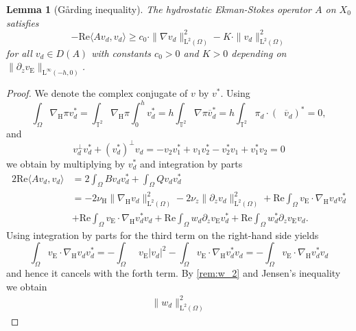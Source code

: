 \documentclass[preprint]{elsarticle}
\newtheorem{lem}[lem]{Lemma}
\numberwithin{equation}{section}
\newcommand {\T}	{\mathbb{T}}
\DeclareMathOperator{\divH}{div_{\H}}
\renewcommand{\Re}{\mathrm{Re}}
\renewcommand{\H}{\mathrm{H}}
\newcommand{\dk}[1]{\partial_{#1}}
\newcommand{\dz}{\dk{z}}
\renewcommand{\bar}[1]{\overline{#1}}
\newcommand{\vbar}{\bar{v}}
\newcommand{\nablaH}{\nabla_{\H}}
\newcommand{\rL}{\mathrm{L}}
\newcommand{\rH}{\H}
\newcommand{\rE}{\mathrm{E}}
\begin{document}
\begin{lem}[G\aa rding inequality]\label{lem:garding inequality_2}
	The hydrostatic Ekman-Stokes operator $A$ on $X_0$ satisfies 
	\begin{equation*}
		- \Re \langle A v_d, v_d \rangle 
		\geq c_0 \cdot \| \nabla v_d \|_{\rL^2(\Omega)}^2 - K \cdot \| v_d \|_{\rL^2(\Omega)}^2
	\end{equation*}
	for all $v_d \in D(A)$
	with constants $c_0 > 0$ and $K > 0$ depending on $\| \partial_z v_{\rE} \|_{\rL^\infty(-h,0)}$. 
\end{lem}
\begin{proof}
	We denote the complex conjugate of $v$ by $v^\ast$. 
	Using 
	\begin{equation*}
		\int_{\Omega} \nablaH \pi v_d^\ast 
		= \int_{\T^2} \nablaH \pi \int_0^h v_d^\ast 
		= h \int_{\T^2} \nabla \pi \vbar_d^\ast 
		= h \int_{\T^2} \pi_d \cdot  (\divH\vbar_d)^\ast = 0,
	\end{equation*}
	and 
	\begin{equation*}
		v_d^\perp v_d^\ast + (v_d^\ast)^\perp v_d 
		= -v_2 v_1^\ast + v_1 v_2^\ast-v_2^\ast v_1 + v_1^\ast v_2 = 0 
	\end{equation*}
	we obtain by 
	multiplying by $v_d^\ast$  
	and integration by parts
	\begin{align*}
		2\Re \langle A v_d, v_d \rangle 
		&= 2\int_{\Omega} B v_d v_d^* + \int_{\Omega} Q v_d v_d^* \\
		&= -2\nu_{\rH} \| \nablaH v_d \|_{\rL^2(\Omega)}^2
		- 2\nu_z \| \dz v_d \|_{\rL^2(\Omega)}^2
		+\Re \int_{\Omega} v_{\rE} \cdot \nablaH v_d v_d^\ast \\
		&+ \Re\int_{\Omega} v_{\rE} \cdot \nablaH v_d^\ast v_d 
		+ \Re \int_{\Omega} w_d \dz v_{\rE} v_d^\ast
		+ \Re \int_{\Omega} w_d^\ast \dz v_{\rE} v_d .
	\end{align*}
	Using integration by parts for
	the third term on the right-hand side yields
	\begin{equation*}
		\int_{\Omega} v_{\rE} \cdot \nablaH v_d v_d^\ast 
		= - \int_{\Omega} \divH v_{\rE} |v_d|^2 -\int_{\Omega} v_{\rE} \cdot \nablaH v_d^\ast v_d
		= -\int_{\Omega} v_{\rE} \cdot \nablaH v_d^\ast v_d
	\end{equation*}
	and hence it cancels with the forth term. By \autoref{rem:w_2} and Jensen's inequality we obtain
	\begin{equation}
		\label{eq:w jensen_2}
		\begin{aligned} 
			\| w_d \|_{\rL^2(\Omega)}^2

\end{aligned}
\end{equation}
\end{proof}
\end{document}
